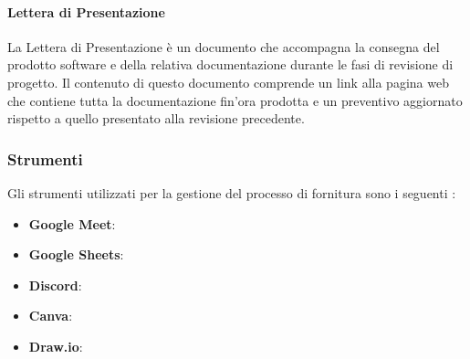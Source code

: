     \paragraph{Lettera di Presentazione}
    La Lettera di Presentazione è un documento che accompagna la consegna del prodotto software e della relativa documentazione durante le fasi di revisione di progetto. Il contenuto di questo documento comprende un link alla pagina web che contiene tutta la documentazione fin'ora prodotta e un preventivo aggiornato rispetto a quello presentato alla revisione precedente.\\

\subsubsection{Strumenti}
 Gli strumenti utilizzati per la gestione del processo di fornitura sono i seguenti :
 \begin{itemize}
    \item \textbf{Google Meet}:
    \item \textbf{Google Sheets}:
    \item \textbf{Discord}:
    \item \textbf{Canva}:
    \item \textbf{Draw.io}:
 \end{itemize}